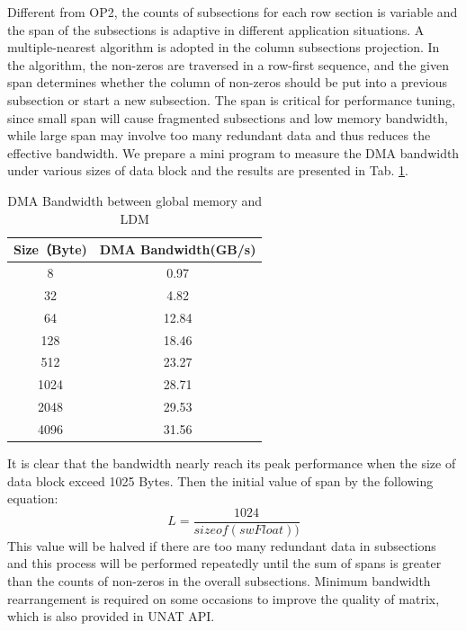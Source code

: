 \documentclass[5p,times]{elsarticle}
\begin{document}
Different from OP2\cite{b2}, the counts of subsections for each row section is variable and the span of the subsections is adaptive in different application situations. A multiple-nearest algorithm is adopted in the column subsections projection. In the algorithm, the non-zeros are traversed in a row-first sequence, and the given span determines whether the column of non-zeros should be put into a previous subsection or start a new subsection. The span is critical for performance tuning, since small span will cause fragmented subsections and low memory bandwidth, while large span may involve too many redundant data and thus reduces the effective bandwidth. We prepare a mini program to measure the DMA bandwidth under various sizes of data block and the results are presented in Tab. \ref{bandwidth}.
\begin{table}[]
\centering
\caption{DMA Bandwidth between global memory and LDM}
\label{bandwidth}
\begin{tabular}{cc}
\hline
Size（Byte) & DMA Bandwidth(GB/s) \\ \hline
8          & 0.97                \\
32         & 4.82                \\
64         & 12.84               \\
128        & 18.46               \\
512        & 23.27               \\
1024       & 28.71               \\
2048       & 29.53               \\
4096       & 31.56               \\ \hline
\end{tabular}
\end{table}
It is clear that the bandwidth nearly reach its peak performance when the size of data block exceed 1025 Bytes. Then the initial value of span by the following equation:
\begin{equation}
\label{colLen}
    L=\frac{1024}{sizeof(swFloat))}
\end{equation}
This value will be halved if there are too many redundant data in subsections and this process will be performed repeatedly until the sum of spans is greater than the counts of non-zeros in the overall subsections. Minimum bandwidth rearrangement is required on some occasions to improve the quality of matrix, which is also provided in UNAT API.
\end{document}
